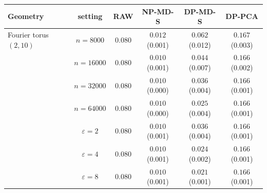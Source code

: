 \begin{tabular}{lccccc}
\toprule
Geometry & setting & RAW & NP-MD-S & DP-MD-S & DP-PCA \\
\midrule
Fourier torus $(2,10)$ & $n=8000$ & $0.080$ & $0.012$ \scriptsize(0.001) & $0.062$ \scriptsize(0.012) & $0.167$ \scriptsize(0.003) \\
 & $n=16000$ & $0.080$ & $0.010$ \scriptsize(0.001) & $0.044$ \scriptsize(0.007) & $0.166$ \scriptsize(0.002) \\
 & $n=32000$ & $0.080$ & $0.010$ \scriptsize(0.000) & $0.036$ \scriptsize(0.004) & $0.166$ \scriptsize(0.001) \\
 & $n=64000$ & $0.080$ & $0.010$ \scriptsize(0.000) & $0.025$ \scriptsize(0.004) & $0.166$ \scriptsize(0.001) \\
 & $\varepsilon=2$ & $0.080$ & $0.010$ \scriptsize(0.001) & $0.036$ \scriptsize(0.004) & $0.166$ \scriptsize(0.001) \\
 & $\varepsilon=4$ & $0.080$ & $0.010$ \scriptsize(0.001) & $0.024$ \scriptsize(0.002) & $0.166$ \scriptsize(0.001) \\
 & $\varepsilon=8$ & $0.080$ & $0.010$ \scriptsize(0.001) & $0.021$ \scriptsize(0.001) & $0.166$ \scriptsize(0.001) \\
\bottomrule
\end{tabular}

